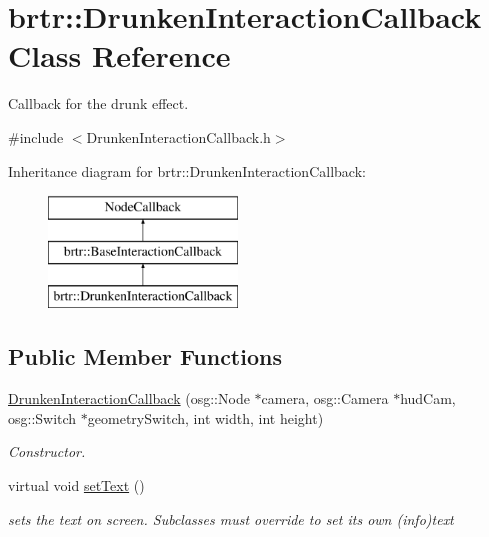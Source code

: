 \hypertarget{classbrtr_1_1_drunken_interaction_callback}{\section{brtr\+:\+:Drunken\+Interaction\+Callback Class Reference}
\label{classbrtr_1_1_drunken_interaction_callback}
}


Callback for the drunk effect.  




{\ttfamily \#include $<$Drunken\+Interaction\+Callback.\+h$>$}

Inheritance diagram for brtr\+:\+:Drunken\+Interaction\+Callback\+:\begin{figure}[H]
\begin{center}
\leavevmode
\includegraphics[height=3.000000cm]{classbrtr_1_1_drunken_interaction_callback}
\end{center}
\end{figure}
\subsection*{Public Member Functions}
\begin{DoxyCompactItemize}
\item 
\hyperlink{classbrtr_1_1_drunken_interaction_callback_aa252ac5f3bc393ecb75784b98e17b5a5}{Drunken\+Interaction\+Callback} (osg\+::\+Node $\ast$camera, osg\+::\+Camera $\ast$hud\+Cam, osg\+::\+Switch $\ast$geometry\+Switch, int width, int height)
\begin{DoxyCompactList}\small\item\em Constructor. \end{DoxyCompactList}\item 
virtual void \hyperlink{classbrtr_1_1_drunken_interaction_callback_a71b86fc410bf2965ca998eff1350cfaf}{set\+Text} ()
\begin{DoxyCompactList}\small\item\em sets the text on screen. Subclasses must override to set its own (info)text \end{DoxyCompactList}\end{DoxyCompactItemize}
